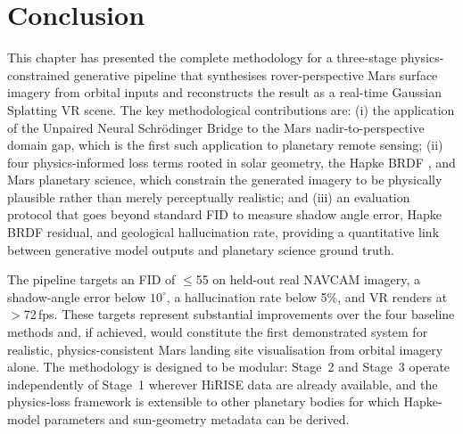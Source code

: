 \documentclass[10pt,journal]{IEEEtran}
\begin{document}
\section{Conclusion}
\label{sec:conclusion}

This chapter has presented the complete methodology for a three-stage
physics-constrained generative pipeline that synthesises rover-perspective Mars
surface imagery from orbital inputs and reconstructs the result as a real-time
Gaussian Splatting VR scene. The key methodological contributions are: (i) the
application of the Unpaired Neural Schr\"{o}dinger Bridge to the Mars
nadir-to-perspective domain gap, which is the first such application to planetary
remote sensing; (ii) four physics-informed loss terms rooted in solar geometry,
the Hapke BRDF \cite{hapke2012theory}, and Mars planetary science, which
constrain the generated imagery to be physically plausible rather than merely
perceptually realistic; and (iii) an evaluation protocol that goes beyond
standard FID to measure shadow angle error, Hapke BRDF residual, and geological
hallucination rate, providing a quantitative link between generative model
outputs and planetary science ground truth.

The pipeline targets an FID of $\leq$55 on held-out real NAVCAM imagery,
a shadow-angle error below $10^{\circ}$, a hallucination rate below 5\%, and
VR renders at $>$72\,fps. These targets represent substantial improvements over
the four baseline methods and, if achieved, would constitute the first
demonstrated system for realistic, physics-consistent Mars landing site
visualisation from orbital imagery alone. The methodology is designed to be
modular: Stage~2 and Stage~3 operate independently of Stage~1 wherever HiRISE
data are already available, and the physics-loss framework is extensible to
other planetary bodies for which Hapke-model parameters and sun-geometry
metadata can be derived.



\end{document}
